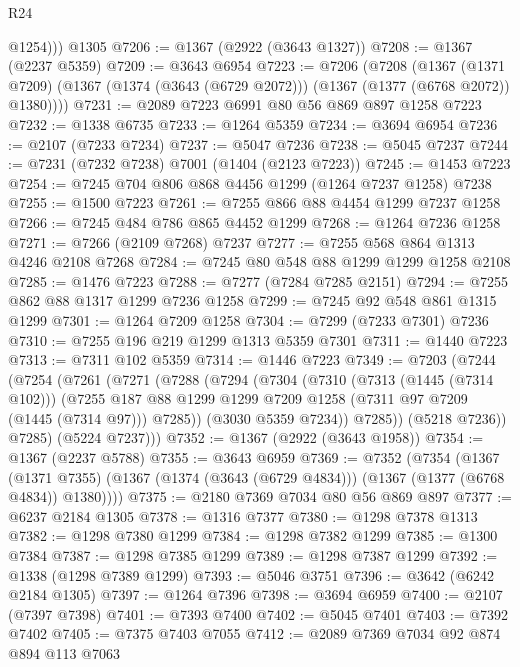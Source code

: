 \begin{lexlean}{R24}
\begin{coremodule}
          @1254)))
    @1305
@7206 := @1367 (@2922 (@3643 @1327))
@7208 := @1367 (@2237 @5359)
@7209 := @3643 @6954
@7223 := @7206
    (@7208
      (@1367
        (@1371 @7209)
        (@1367 (@1374 (@3643 (@6729 @2072))) (@1367 (@1377 (@6768 @2072)) @1380))))
@7231 := @2089 @7223 @6991 @80 @56 @869 @897 @1258 @7223
@7232 := @1338 @6735
@7233 := @1264 @5359
@7234 := @3694 @6954
@7236 := @2107 (@7233 @7234)
@7237 := @5047 @7236
@7238 := @5045 @7237
@7244 := @7231 (@7232 @7238) @7001 (@1404 (@2123 @7223))
@7245 := @1453 @7223
@7254 := @7245 @704 @806 @868 @4456 @1299 (@1264 @7237 @1258) @7238
@7255 := @1500 @7223
@7261 := @7255 @866 @88 @4454 @1299 @7237 @1258
@7266 := @7245 @484 @786 @865 @4452 @1299
@7268 := @1264 @7236 @1258
@7271 := @7266 (@2109 @7268) @7237
@7277 := @7255 @568 @864 @1313 @4246 @2108 @7268
@7284 := @7245 @80 @548 @88 @1299 @1299 @1258 @2108
@7285 := @1476 @7223
@7288 := @7277 (@7284 @7285 @2151)
@7294 := @7255 @862 @88 @1317 @1299 @7236 @1258
@7299 := @7245 @92 @548 @861 @1315 @1299
@7301 := @1264 @7209 @1258
@7304 := @7299 (@7233 @7301) @7236
@7310 := @7255 @196 @219 @1299 @1313 @5359 @7301
@7311 := @1440 @7223
@7313 := @7311 @102 @5359
@7314 := @1446 @7223
@7349 := @7203
    (@7244
      (@7254
        (@7261
          (@7271
            (@7288
              (@7294
                (@7304
                  (@7310
                    (@7313 (@1445 (@7314 @102)))
                    (@7255
                      @187
                      @88
                      @1299
                      @1299
                      @7209
                      @1258
                      (@7311 @97 @7209 (@1445 (@7314 @97)))
                      @7285))
                  (@3030 @5359 @7234))
                @7285))
            (@5218 @7236))
          @7285)
        (@5224 @7237)))
@7352 := @1367 (@2922 (@3643 @1958))
@7354 := @1367 (@2237 @5788)
@7355 := @3643 @6959
@7369 := @7352
    (@7354
      (@1367
        (@1371 @7355)
        (@1367 (@1374 (@3643 (@6729 @4834))) (@1367 (@1377 (@6768 @4834)) @1380))))
@7375 := @2180 @7369 @7034 @80 @56 @869 @897
@7377 := @6237 @2184 @1305
@7378 := @1316 @7377
@7380 := @1298 @7378 @1313
@7382 := @1298 @7380 @1299
@7384 := @1298 @7382 @1299
@7385 := @1300 @7384
@7387 := @1298 @7385 @1299
@7389 := @1298 @7387 @1299
@7392 := @1338 (@1298 @7389 @1299)
@7393 := @5046 @3751
@7396 := @3642 (@6242 @2184 @1305)
@7397 := @1264 @7396
@7398 := @3694 @6959
@7400 := @2107 (@7397 @7398)
@7401 := @7393 @7400
@7402 := @5045 @7401
@7403 := @7392 @7402
@7405 := @7375 @7403 @7055
@7412 := @2089 @7369 @7034 @92 @874 @894 @113 @7063

\end{coremodule}
\end{lexlean}
